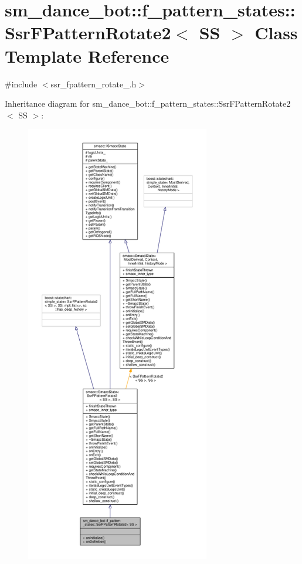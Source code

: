 \hypertarget{structsm__dance__bot_1_1f__pattern__states_1_1SsrFPatternRotate2}{}\section{sm\+\_\+dance\+\_\+bot\+:\+:f\+\_\+pattern\+\_\+states\+:\+:Ssr\+F\+Pattern\+Rotate2$<$ SS $>$ Class Template Reference}
\label{structsm__dance__bot_1_1f__pattern__states_1_1SsrFPatternRotate2}


{\ttfamily \#include $<$ssr\+\_\+fpattern\+\_\+rotate\+\_.\+h$>$}



Inheritance diagram for sm\+\_\+dance\+\_\+bot\+:\+:f\+\_\+pattern\+\_\+states\+:\+:Ssr\+F\+Pattern\+Rotate2$<$ SS $>$\+:\nopagebreak
\begin{figure}[H]
\begin{center}
\leavevmode
\includegraphics[height=550pt]{structsm__dance__bot_1_1f__pattern__states_1_1SsrFPatternRotate2__inherit__graph}
\end{center}
\end{figure}


